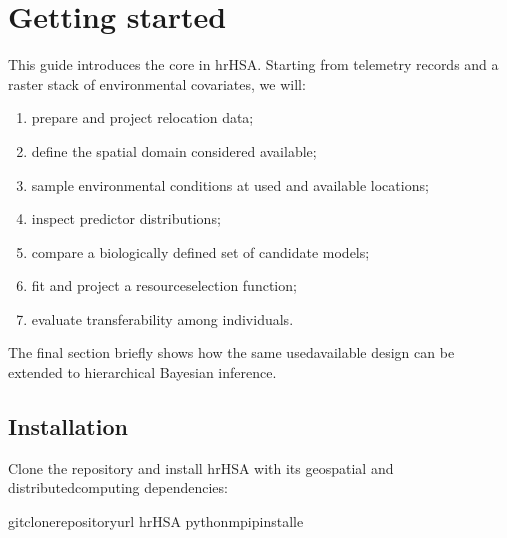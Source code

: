 \documentclass[letterpaper,10pt,english]{sphinxmanual}
\begin{document}
\chapter{Getting started}
\label{\detokenize{getting_started:getting-started}}\label{\detokenize{getting_started::doc}}
\sphinxAtStartPar
This guide introduces the core  in hrHSA. Starting from telemetry records and a raster stack of environmental covariates, we will:
\begin{enumerate}
%
\item {} 
\sphinxAtStartPar
prepare and project relocation data;

\item {} 
\sphinxAtStartPar
define the spatial domain considered available;

\item {} 
\sphinxAtStartPar
sample environmental conditions at used and available locations;

\item {} 
\sphinxAtStartPar
inspect predictor distributions;

\item {} 
\sphinxAtStartPar
compare a biologically defined set of candidate models;

\item {} 
\sphinxAtStartPar
fit and project a resource\sphinxhyphen{}selection function;

\item {} 
\sphinxAtStartPar
evaluate transferability among individuals.

\end{enumerate}

\sphinxAtStartPar
The final section briefly shows how the same used\textendash{}available design can be extended to hierarchical Bayesian inference.


\section{Installation}
\label{\detokenize{getting_started:installation}}
\sphinxAtStartPar
Clone the repository and install hrHSA with its geospatial and distributed\sphinxhyphen{}computing dependencies:

\begin{sphinxVerbatim}[commandchars=\\\{\}]
gitclone\PYGZlt{}repository\PYGZhy{}url\PYGZgt{}
hrHSA
python\PYGZhy{}mpipinstall\PYGZhy{}e
\end{sphinxVerbatim}
\end{document}
